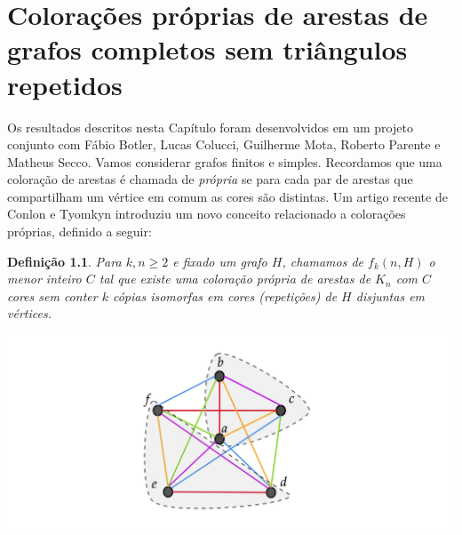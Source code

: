 \documentclass[12pt,a4paper]{book}
\newtheorem{defi}  [teorema] {Definição}
\begin{document}




\chapter[Colorações de grafos completos sem $K_3$ repetidos]{Colorações próprias de arestas de grafos completos sem triângulos repetidos}
\label{cap:triangles} 


Os resultados descritos nesta Capítulo foram desenvolvidos em um projeto conjunto com Fábio Botler, Lucas Colucci, Guilherme Mota, Roberto Parente e Matheus Secco.
Vamos considerar grafos finitos e simples. 
Recordamos que uma coloração de arestas é chamada de \emph{própria} se para cada par de arestas que compartilham um vértice em comum as cores são distintas. Um artigo recente de Conlon e Tyomkyn  \cite{conlontyomkyn} introduziu um novo conceito relacionado a colorações próprias, definido a seguir: 

\begin{defi}\label{def:fkn}
            Para $k,n\geq 2$ e fixado um grafo $H$, chamamos de $f_k(n,H)$ o menor inteiro $C$ tal que existe uma coloração
            própria de arestas de $K_n$ com $C$ cores sem conter $k$ cópias isomorfas em cores (\emph{repetições}) de $H$ disjuntas em vértices. 
\end{defi}

  \begin{center}
			\includegraphics[scale=0.25, keepaspectratio=true]{K6-repet-mark.png}
			\label{fig:K12} 
	\end{center}
	
\end{document}
